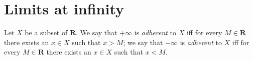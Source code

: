 \section{Limits at infinity}\label{sec 9.10}

\begin{definition}\label{9.10.1}
    Let \(X\) be a subset of \(\mathbf{R}\).
    We say that \(+\infty\) is \emph{adherent} to \(X\) iff for every \(M \in \mathbf{R}\) there exists an \(x \in X\) such that \(x > M\);
    we say that \(-\infty\) is \emph{adherent} to \(X\) iff for every \(M \in \mathbf{R}\) there exists an \(x \in X\) such that \(x < M\).
\end{definition}